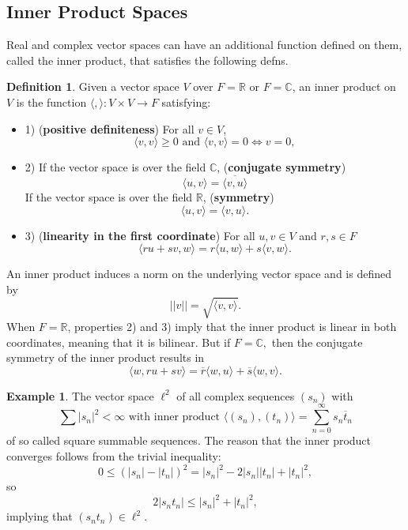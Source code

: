 \documentclass[psamsfonts]{amsart}
\theoremstyle{definition}
\newtheorem{exmp}[thm]{Example}
\newtheorem{defn}[thm]{Definition}
\theoremstyle{remark}
\numberwithin{equation}{section}
\begin{document}
\subsection{Inner Product Spaces}
Real and complex vector spaces can have an additional function defined on them, called the inner product, that satisfies the following defns. 
\begin{defn} 
Given a vector space $V$ over $F = \mathbb{R}$ or $F = \mathbb{C}$, an inner product on $V$ is the function $\langle , \rangle : V \times V \rightarrow F$ satisfying:
\begin{itemize}
    \item 1) (\textbf{positive definiteness}) For all $v \in V$, 
    $$\langle v, v \rangle \geq 0 \text{ and } \langle v, v \rangle = 0 \iff v = 0 ,$$
    \item 2) If the vector space is over the field $\mathbb{C}$, (\textbf{conjugate symmetry})
    $$\langle u, v \rangle = \overline{\langle v, u \rangle} $$
    If the vector space is over the field $\mathbb{R}$, (\textbf{symmetry})
    $$\langle u, v \rangle = \langle v, u \rangle .$$
    \item 3) (\textbf{linearity in the first coordinate}) For all $u,v \in V$ and $r,s \in F$
    $$\langle ru + sv, w \rangle = r \langle u, w \rangle + s\langle v, w \rangle . $$
\end{itemize}
An inner product induces a norm on the underlying vector space and is defined by 
$$|| v || = \sqrt{\langle v, v \rangle}.$$ When $F = \mathbb{R}$, properties 2) and 3) imply that the inner product is linear in both coordinates, meaning that it is bilinear. But if $F = \mathbb{C},$ then the conjugate symmetry of the inner product results in  
$$\langle w, ru + sv \rangle = \overline{r} \langle w, u \rangle + \overline{s} \langle w, v \rangle .$$

\begin{exmp}
The vector space $\ell ^2$ of all complex sequences $(s_n)$ with  
$$\sum |s_n| ^2 < \infty \text{ with inner product } \langle (s_n), (t_n) \rangle = \sum _{n = 0} ^\infty s_n \overline{t}_n$$
of so called square summable sequences. The reason that the inner product converges follows from the trivial inequality: 
$$0 \leq (|s_n| - |t_n|)^2 = |s_n|^2 - 2|s_n| |t_n| + |t_n|^2,$$
so 
$$2 |s_n t_n| \leq |s_n|^2 + |t_n|^2,$$
implying that $(s_n t_n) \in \ell ^2$. 
\end{exmp}
\end{defn}
\end{document}

